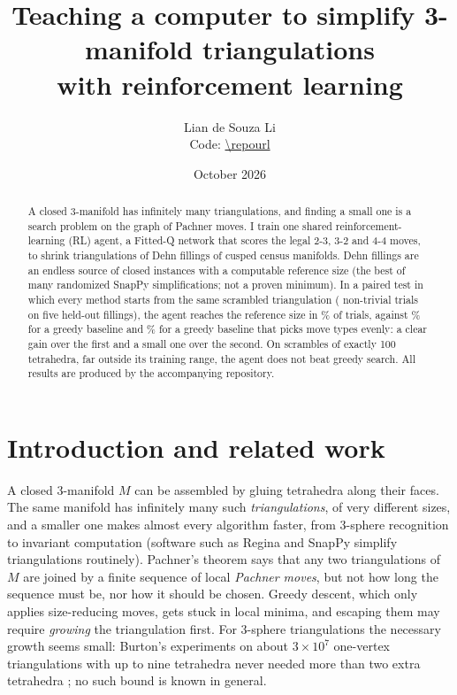 \documentclass[10pt,a4paper]{article}
\title{\vspace{-0.9cm}\textbf{Teaching a computer to simplify 3-manifold triangulations\\ with reinforcement learning}\vspace{-0.2cm}}
\author{Lian de Souza Li \quad {\small IMECC/UNICAMP, Brazil}\\[-1pt] {\small Code: \url{\repourl}}}
\date{October 2026}
\begin{document}
\maketitle\vspace{-0.9cm}

\begin{abstract}\noindent
A closed 3-manifold has infinitely many triangulations, and finding a small one is a search problem on the graph of Pachner moves.
I train one shared reinforcement-learning (RL) agent, a Fitted-Q network that scores the legal 2-3, 3-2 and 4-4 moves, to shrink triangulations of
Dehn fillings of cusped census manifolds. Dehn fillings are an endless source of closed instances with a computable reference size (the best of many randomized SnapPy simplifications; not a proven minimum).
In a paired test in which every method starts from the same scrambled triangulation (\nNTReal{} non-trivial trials on five held-out fillings),
the agent reaches the reference size in \succrlReal\% of trials, against \succgreedyReal\% for a greedy baseline and \succgreedybalReal\% for a greedy baseline that picks move types evenly:
a clear gain over the first and a small one over the second. On scrambles of exactly 100 tetrahedra, far outside its training range, the agent does not beat greedy search.
All results are produced by the accompanying repository.
\end{abstract}

\section{Introduction and related work}
A closed 3-manifold $M$ can be assembled by gluing tetrahedra along their faces. The same manifold has infinitely many such \emph{triangulations}, of very different sizes, and
a smaller one makes almost every algorithm faster, from 3-sphere recognition \cite{thompson} to invariant computation (software such as Regina \cite{regina} and SnapPy \cite{snappy} simplify triangulations routinely).
Pachner's theorem \cite{pachner} says that any two triangulations of $M$ are joined by a finite sequence of local \emph{Pachner moves}, but not how long the sequence must be, nor how it should be chosen.
Greedy descent, which only applies size-reducing moves, gets stuck in local minima, and escaping them may require \emph{growing} the triangulation first.
For 3-sphere triangulations the necessary growth seems small: Burton's experiments on about $3\times10^7$ one-vertex triangulations with up to nine tetrahedra never needed more than two extra tetrahedra \cite{burton}; no such bound is known in general.
\end{document}
